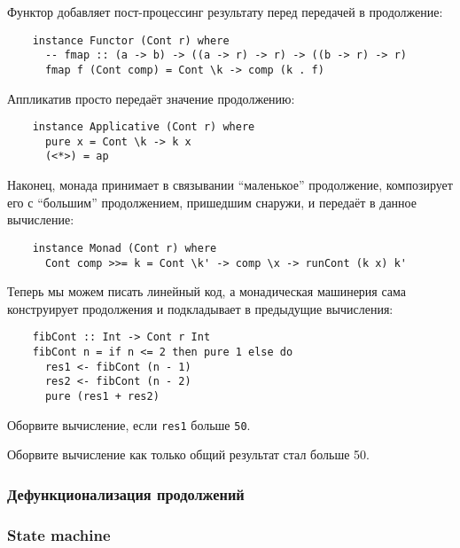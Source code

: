 Функтор добавляет пост-процессинг результату перед передачей в продолжение:
\begin{verbatim}
    instance Functor (Cont r) where
      -- fmap :: (a -> b) -> ((a -> r) -> r) -> ((b -> r) -> r)
      fmap f (Cont comp) = Cont \k -> comp (k . f)
\end{verbatim}

Аппликатив просто передаёт значение продолжению:
\begin{verbatim}
    instance Applicative (Cont r) where
      pure x = Cont \k -> k x
      (<*>) = ap
\end{verbatim}

Наконец, монада принимает в связывании ``маленькое'' продолжение, композирует его с ``большим'' продолжением, пришедшим снаружи, и передаёт в данное вычисление:
\begin{verbatim}
    instance Monad (Cont r) where
      Cont comp >>= k = Cont \k' -> comp \x -> runCont (k x) k'
\end{verbatim}

Теперь мы можем писать линейный код, а монадическая машинерия сама конструирует продолжения и подкладывает в предыдущие вычисления:
\begin{verbatim}
    fibCont :: Int -> Cont r Int
    fibCont n = if n <= 2 then pure 1 else do
      res1 <- fibCont (n - 1)
      res2 <- fibCont (n - 2)
      pure (res1 + res2)
\end{verbatim}

\begin{task}
    Оборвите вычисление, если \texttt{res1} больше \texttt{50}.
\end{task}

\begin{task}
    Оборвите вычисление как только общий результат стал больше 50.
\end{task}



\subsubsection{Дефункционализация продолжений}

\cite{reynolds1972definitional}


\subsubsection{State machine}

